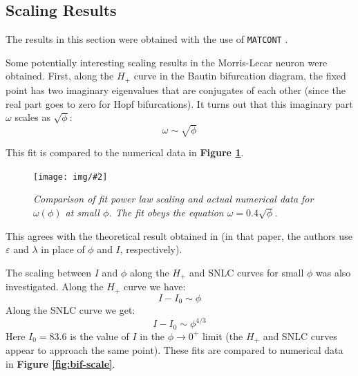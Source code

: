 \documentclass[letterpaper,12pt]{article}
\numberwithin{table}{section}
\numberwithin{figure}{section}
\numberwithin{equation}{section}
\newcommand{\centerfig}[2]{\begin{center}\texttt{[image: img/\#2]}\end{center}}
\newcommand{\ccaption}[1]{\caption{\textit{#1}}}
\newcommand{\reffig}[1]{\textbf{Figure \ref{#1}}}
\begin{document}
\begin{flushleft}
    \subsection{Scaling Results}

    The results in this section were obtained with the use of \texttt{MATCONT} \cite{matcont}.

    Some potentially interesting scaling results in the Morris-Lecar neuron were obtained. First, along the $H_+$ curve in the Bautin bifurcation diagram, the fixed point has two imaginary eigenvalues that are conjugates of each other (since the real part goes to zero for Hopf bifurcations). It turns out that this imaginary part $\omega$ scales as $\sqrt{\phi}$:
    \begin{equation}
        \omega \sim \sqrt{\phi}
    \end{equation}

    This fit is compared to the numerical data in \reffig{fig:phi-im-scale}.
    \begin{figure}[h]

        \centering
 
        \centerfig{0.8}{phi-im-scale.jpg}
    
        \captionsetup{width=0.8\linewidth}
        \ccaption{Comparison of fit power law scaling and actual numerical data for $\omega(\phi)$ at small $\phi$. The fit obeys the equation $\omega = 0.4\sqrt{\phi}$.}
        \label{fig:phi-im-scale}
    
    \end{figure}

    This agrees with the theoretical result obtained in \cite{baer} (in that paper, the authors use $\varepsilon$ and $\lambda$ in place of $\phi$ and $I$, respectively).

    The scaling between $I$ and $\phi$ along the $H_+$ and SNLC curves for small $\phi$ was also investigated. Along the $H_+$ curve we have:
    \begin{equation}
        I - I_0 \sim \phi
    \end{equation}
    Along the SNLC curve we get:
    \begin{equation}
        I - I_0 \sim \phi^{4/3}
    \end{equation}
    Here $I_0 = 83.6$ is the value of $I$ in the $\phi \to 0^+$ limit (the $H_+$ and SNLC curves appear to approach the same point). These fits are compared to numerical data in \reffig{fig:bif-scale}.
    \begin{figure}[!h]


\end{figure}
\end{flushleft}
\end{document}

